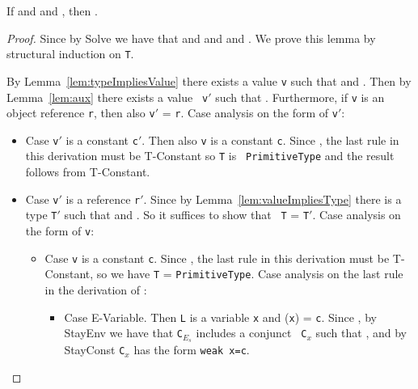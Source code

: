 \begin{Lemma}
\label{lem:keyAux}
 If \emph{} and
 \emph{}  and
\emph{}, then
  \emph{}. 
\end{Lemma}
\begin{proof}
Since  by
{\sc Solve} we have that 
     and
     and
     and
    .
We prove this lemma by structural induction on {\tt T}.  

By Lemma~\ref{lem:typeImpliesValue} there exists a value {\tt v}
such that  and .
Then by Lemma~\ref{lem:aux} there exists a value {\tt
  v$'$} such that
  .  Furthermore, if {\tt v}
  is an object reference {\tt r}, then also {\tt v$'$} = {\tt r}.
  Case analysis on the form of {\tt v$'$}:
 \begin{itemize}
\item Case {\tt v$'$} is a constant {\tt c$'$}.  Then also {\tt v} is
  a constant {\tt c}.  Since , the last rule
  in this derivation must be {\sc T-Constant} so {\tt T} is {\tt
    PrimitiveType} and the result follows from {\sc T-Constant}.
  \item Case {\tt v$'$} is a reference {\tt r$'$}.  Since 
 by 
  Lemma~\ref{lem:valueImpliesType} there is a type {\tt T$'$} such
  that
     and
  .   
So it suffices to show that {\tt
    T} = {\tt T$'$}.  Case analysis on the form of
  {\tt v}:
\begin{itemize}
\item Case {\tt v} is a constant {\tt c}.  Since , the
    last rule in this derivation must be {\sc T-Constant}, so 
   we have {\tt T} = {\tt PrimitiveType}.  Case analysis on the last
   rule in the derivation of :
  \begin{itemize}
  \item Case {\sc E-Variable}.  Then {\tt L} is a variable {\tt x} and
  \Euid({\tt x}) = {\tt c}.  Since , by
  {\sc StayEnv} we have that {\tt C$_{E_s}$} includes a conjunct {\tt
    C$_x$} such that , and by {\sc
    StayConst}
{\tt C$_x$} has the form {\tt weak x=c}.  


\end{itemize}
\end{itemize}
\end{itemize}
\end{proof}
